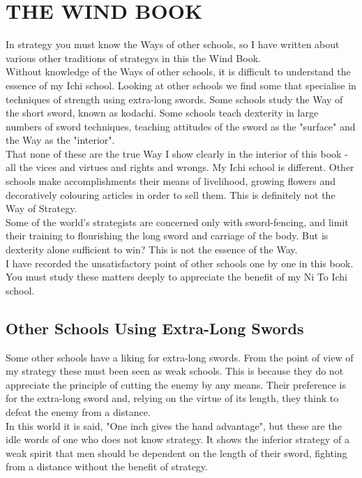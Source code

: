 \chapter{THE WIND BOOK}

In strategy you must know the Ways of other schools, so I have written about various other traditions of strategys in this the Wind Book.\\

Without knowledge of the Ways of other schools, it is difficult to understand the essence of my Ichi school. Looking at other schools we find some that specialise in techniques of strength using extra-long swords. Some schools study the Way of the short sword, known as kodachi. Some schools teach dexterity in large numbers of sword techniques, teaching attitudes of the sword as the "surface" and the Way as the "interior".\\

That none of these are the true Way I show clearly in the interior of this book - all the vices and virtues and rights and wrongs. My Ichi school is different. Other schools make accomplishments their means of livelihood, growing flowers and decoratively colouring articles in order to sell them. This is definitely not the Way of Strategy.\\

Some of the world's strategists are concerned only with sword-fencing, and limit their training to flourishing the long sword and carriage of the body. But is dexterity alone sufficient to win? This is not the essence of the Way.\\

I have recorded the unsatisfactory point of other schools one by one in this book. You must study these matters deeply to appreciate the benefit of my Ni To Ichi school.\\
\section{Other Schools Using Extra-Long Swords}

Some other schools have a liking for extra-long swords. From the point of view of my strategy these must been seen as weak schools. This is because they do not appreciate the principle of cutting the enemy by any means. Their preference is for the extra-long sword and, relying on the virtue of its length, they think to defeat the enemy from a distance.\\

In this world it is said, "One inch gives the hand advantage", but these are the idle words of one who does not know strategy. It shows the inferior strategy of a weak spirit that men should be dependent on the length of their sword, fighting from a distance without the benefit of strategy.\\

